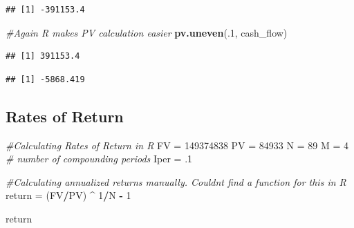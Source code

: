 \documentclass[]{article}
\newenvironment{Shaded}{\begin{snugshade}}{\end{snugshade}}
\newcommand{\CommentTok}[1]{\textcolor[rgb]{0.56,0.35,0.01}{\textit{#1}}}
\newcommand{\DataTypeTok}[1]{\textcolor[rgb]{0.13,0.29,0.53}{#1}}
\newcommand{\DecValTok}[1]{\textcolor[rgb]{0.00,0.00,0.81}{#1}}
\newcommand{\FloatTok}[1]{\textcolor[rgb]{0.00,0.00,0.81}{#1}}
\newcommand{\KeywordTok}[1]{\textcolor[rgb]{0.13,0.29,0.53}{\textbf{#1}}}
\newcommand{\NormalTok}[1]{#1}
\newcommand{\OperatorTok}[1]{\textcolor[rgb]{0.81,0.36,0.00}{\textbf{#1}}}
\newcommand{\StringTok}[1]{\textcolor[rgb]{0.31,0.60,0.02}{#1}}
\begin{document}
\begin{verbatim}
## [1] -391153.4
\end{verbatim}

\begin{Shaded}
\begin{Highlighting}[]
 \CommentTok{#Again R makes PV calculation easier}
 \KeywordTok{pv.uneven}\NormalTok{(.}\DecValTok{1}\NormalTok{, cash_flow)}
\end{Highlighting}
\end{Shaded}

\begin{verbatim}
## [1] 391153.4
\end{verbatim}

\begin{Shaded}
\end{Shaded}

\begin{verbatim}
## [1] -5868.419
\end{verbatim}

\hypertarget{rates-of-return}{%
\subsection{Rates of Return}\label{rates-of-return}}

\begin{Shaded}
\begin{Highlighting}[]
\CommentTok{#Calculating Rates of Return in R}
\NormalTok{FV =}\StringTok{ }\DecValTok{149374838}
\NormalTok{PV =}\StringTok{ }\DecValTok{84933}
\NormalTok{N =}\StringTok{ }\DecValTok{89}
\NormalTok{M =}\StringTok{ }\DecValTok{4} \CommentTok{# number of compounding periods}
\NormalTok{Iper =}\StringTok{ }\FloatTok{.1}

\CommentTok{#Calculating annualized returns manually.  Couldnt find a function for this in R}
\NormalTok{return =}\StringTok{ }\NormalTok{(FV}\OperatorTok{/}\NormalTok{PV) }\OperatorTok{^}\StringTok{ }\DecValTok{1}\OperatorTok{/}\NormalTok{N }\OperatorTok{-}\StringTok{ }\DecValTok{1}

\NormalTok{return}
\end{Highlighting}
\end{Shaded}
\end{document}
